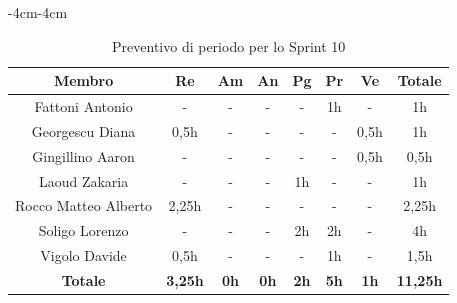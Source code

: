 \documentclass[a4paper,12pt]{article}
\begin{document}
\begin{table}[H]
    \begin{adjustwidth}{-4cm}{-4cm}
    \centering
    \begin{tabular}{|c|c|c|c|c|c|c|c|}
        \hline
        \textbf{Membro} & \textbf{Re} & \textbf{Am} & \textbf{An} & \textbf{Pg} & \textbf{Pr} & \textbf{Ve} & \textbf{Totale} \\
        \hline
        Fattoni Antonio & - & - & - & - & 1h & - & 1h \\
        \hline
        Georgescu Diana & 0,5h & - & - & - & - & 0,5h & 1h \\
        \hline
        Gingillino Aaron & - & - & - & - & - & 0,5h & 0,5h \\
        \hline
        Laoud Zakaria & - & - & - & 1h & - & - & 1h \\
        \hline
        Rocco Matteo Alberto & 2,25h & - & - & - & - & - & 2,25h \\
        \hline
        Soligo Lorenzo & - & - & - & 2h & 2h & - & 4h \\
        \hline
        Vigolo Davide & 0,5h & - & - & - & 1h & - & 1,5h \\
        \hline
          \textbf{Totale} & \textbf{3,25h} & \textbf{0h} & \textbf{0h} & \textbf{2h} & \textbf{5h} & \textbf{1h} & \textbf{11,25h} \\
        \hline
    \end{tabular}
    \caption{Preventivo di periodo per lo Sprint 10}
    \end{adjustwidth}
\end{table}
\end{document}
